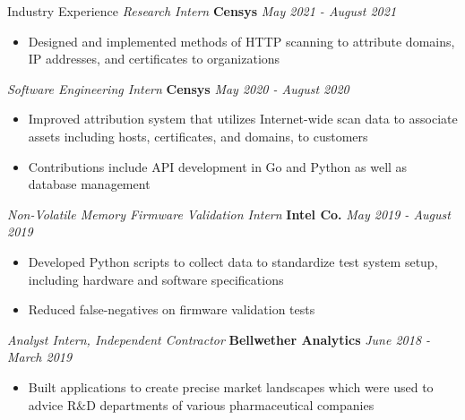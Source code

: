 \documentclass{resume} %
\begin{document}
	\begin{rSection}{Industry Experience}
		{\emph{Research Intern} \bf Censys} \hfill{\em May 2021 - August 2021}
		\vspace{-2mm}
		\begin{itemize}
			\item Designed and implemented methods of HTTP scanning to attribute domains, IP addresses, and certificates to organizations
		\end{itemize}
		{\emph{Software Engineering Intern} \bf Censys} \hfill{\em May 2020 - August 2020}
		\vspace{-2mm}
		\begin{itemize}
			\item Improved attribution system that utilizes Internet-wide scan data to associate assets including hosts, certificates, and domains, to customers
			\item Contributions include API development in Go and Python as well as database management
		\end{itemize}
		{\emph{Non-Volatile Memory Firmware Validation Intern} \bf Intel Co.} \hfill{\em May 2019 - August 2019}
		\vspace{-2mm}
		\begin{itemize}
			\item Developed Python scripts to collect data to standardize test system setup, including hardware and software specifications
			\item Reduced false-negatives on firmware validation tests
		\end{itemize}
		{\emph{Analyst Intern, Independent Contractor} \bf Bellwether Analytics} \hfill{\em June 2018 - March 2019}
		\begin{itemize}
			\item Built applications to create precise market landscapes which were used to advice R$\&$D departments of various pharmaceutical companies
%			
		\end{itemize}
		
	\end{rSection}
	
		
\end{document}
